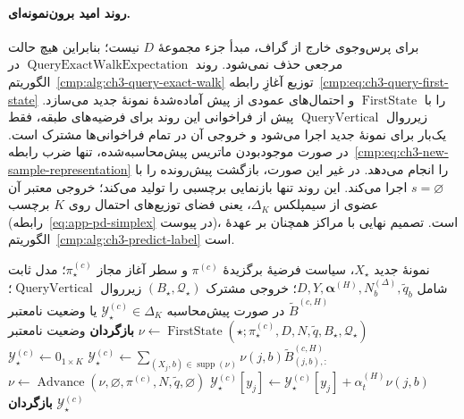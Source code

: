 \paragraph{روند امید برون‌نمونه‌ای.}
برای پرس‌وجوی خارج از گراف، مبدأ
جزء مجموعهٔ $D$ نیست؛ بنابراین
هیچ حالت مرجعی حذف نمی‌شود.
روند $\operatorname{QueryExactWalkExpectation}$
در الگوریتم~\ref{cmp:alg:ch3-query-exact-walk}
توزیع آغازِ رابطه~\eqref{cmp:eq:ch3-query-first-state}
را با $\operatorname{FirstState}$ و احتمال‌های
عمودی از پیش آماده‌شدهٔ نمونهٔ جدید می‌سازد.
زیرروال $\operatorname{QueryVertical}$ پیش از
فراخوانی این روند برای فرضیه‌های طبقه، فقط
یک‌بار برای نمونهٔ جدید اجرا می‌شود و خروجی
آن در تمام فراخوانی‌ها مشترک است. در صورت موجودبودن
ماتریس پیش‌محاسبه‌شده، تنها
ضرب رابطه~\eqref{cmp:eq:ch3-new-sample-representation}
را انجام می‌دهد. در غیر این
صورت، بازگشت پیش‌رونده را با
$s=\varnothing$ اجرا می‌کند.
این روند تنها بازنمایی برچسبی
را تولید می‌کند؛ خروجی معتبر آن عضوی از سیمپلکس
$\Delta_K$، یعنی فضای توزیع‌های احتمال روی $K$ برچسب
(رابطه~\eqref{eq:app-pd-simplex} در پیوست)، است.
تصمیم نهایی
با مراکز همچنان بر عهدهٔ
الگوریتم~\ref{cmp:alg:ch3-predict-label}
است.

\begin{algorithm}[!htbp]
\caption{روند $\operatorname{QueryExactWalkExpectation}$: امید دقیق پرس‌وجوی برون‌نمونه‌ای}
\label{cmp:alg:ch3-query-exact-walk}
\begin{algorithmic}[1]
\REQUIRE نمونهٔ جدید $X_\star$، سیاست فرضیهٔ
برگزیدهٔ $\pi^{(c)}$ و سطر آغاز مجاز
$\pi_\star^{(c)}$؛ مدل ثابت شامل
$D,Y,\boldsymbol\alpha^{(H)},N_b^{(\Delta)},\widetilde q_b$؛
خروجی مشترک $(B_\star,\mathcal Q_\star)$
زیرروال $\operatorname{QueryVertical}$؛
$\widetilde B^{(c,H)}$ در صورت پیش‌محاسبه
\ENSURE $\mathscr Y_\star^{(c)}\in\Delta_K$
یا وضعیت نامعتبر
\STATE $\nu\gets\operatorname{FirstState}
(\star;\pi_\star^{(c)},D,N,\widetilde q,
B_\star,\mathcal Q_\star)$
    \STATE \textbf{بازگردان} وضعیت نامعتبر
\ENDIF
{}
    \STATE $\mathscr Y_\star^{(c)}\gets
    \sum_{(X_j,b)\in\operatorname{supp}(\nu)}
    \nu(j,b)\widetilde B_{(j,b),:}^{(c,H)}$
\ELSE
    \STATE $\mathscr Y_\star^{(c)}\gets0_{1\times K}$
            \STATE $\mathscr Y_\star^{(c)}[y_j]
            \gets\mathscr Y_\star^{(c)}[y_j]
            +\alpha_t^{(H)}\nu(j,b)$
        \ENDFOR
            \STATE $\nu\gets\operatorname{Advance}
            (\nu,\varnothing,\pi^{(c)},N,\widetilde q,\varnothing)$
        \ENDIF
    \ENDFOR
\ENDIF
\STATE \textbf{بازگردان} $\mathscr Y_\star^{(c)}$
\end{algorithmic}
\end{algorithm}

